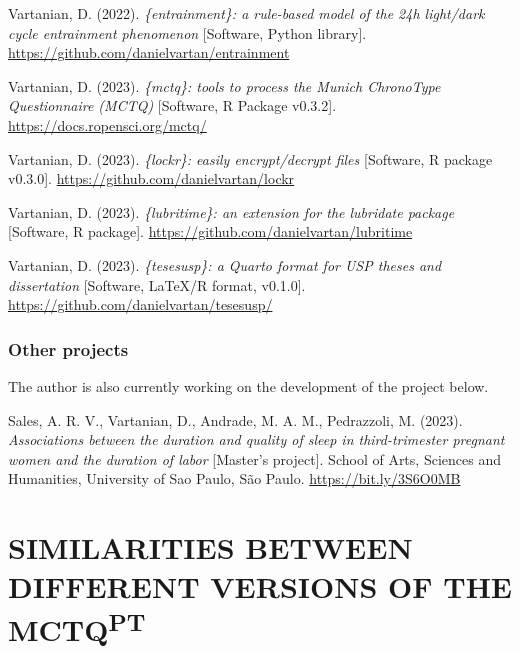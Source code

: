 \documentclass[
  12pt,
  a4paper,
  oneside]{tesesusp}
\begin{document}
\vspace{15pt}

\noindent Vartanian, D. (2022). \emph{\{entrainment\}: a rule-based
model of the 24h light/dark cycle entrainment phenomenon} {[}Software,
Python library{]}. \url{https://github.com/danielvartan/entrainment}

\vspace{5pt}

\noindent Vartanian, D. (2023). \emph{\{mctq\}: tools to process the
Munich ChronoType Questionnaire (MCTQ)} {[}Software, R Package
v0.3.2{]}. \url{https://docs.ropensci.org/mctq/}

\vspace{5pt}

\noindent Vartanian, D. (2023). \emph{\{lockr\}: easily encrypt/decrypt
files} {[}Software, R package v0.3.0{]}.
\url{https://github.com/danielvartan/lockr}

\vspace{5pt}

\noindent Vartanian, D. (2023). \emph{\{lubritime\}: an extension for
the lubridate package} {[}Software, R package{]}.
\url{https://github.com/danielvartan/lubritime}

\vspace{5pt}

\noindent Vartanian, D. (2023). \emph{\{tesesusp\}: a Quarto format for
USP theses and dissertation} {[}Software, LaTeX/R format, v0.1.0{]}.
\url{https://github.com/danielvartan/tesesusp/}

\hypertarget{other-projects}{%
\subsection{Other projects}\label{other-projects}}

The author is also currently working on the development of the project
below.

\vspace{15pt}

\noindent Sales, A. R. V., Vartanian, D., Andrade, M. A. M., Pedrazzoli,
M. (2023). \emph{Associations between the duration and quality of sleep
in third-trimester pregnant women and the duration of labor} {[}Master's
project{]}. School of Arts, Sciences and Humanities, University of Sao
Paulo, São Paulo. \url{https://bit.ly/3S6O0MB}


\hypertarget{similarities-between-different-versions-of-the-mctqpt}{%
\chapter{\texorpdfstring{SIMILARITIES BETWEEN DIFFERENT VERSIONS OF THE
MCTQ\textsuperscript{PT}}{SIMILARITIES BETWEEN DIFFERENT VERSIONS OF THE MCTQPT}}\label{similarities-between-different-versions-of-the-mctqpt}}
\end{document}
